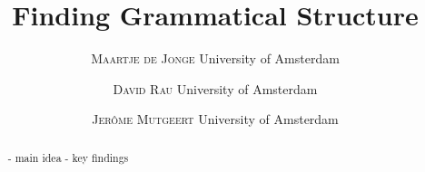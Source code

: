 \documentclass[twoside]{article}
\title{\vspace{-15mm}\fontsize{24pt}{10pt}\selectfont\textbf{Finding Grammatical Structure}} %
\author{
\large
\textsc{Maartje de Jonge} %
\normalsize University of Amsterdam \\ %
\vspace{-5mm}
\and
\large
\textsc{David Rau} %
\normalsize University of Amsterdam \\ %
\and
\vspace{-5mm}
\large
\textsc{Jer\^ome Mutgeert} %
\normalsize University of Amsterdam \\ %
}
\date{}
\begin{document}
\maketitle %

\thispagestyle{fancy} %


\begin{abstract}

\noindent 
- main idea
- key findings

\end{abstract}

\end{document}
